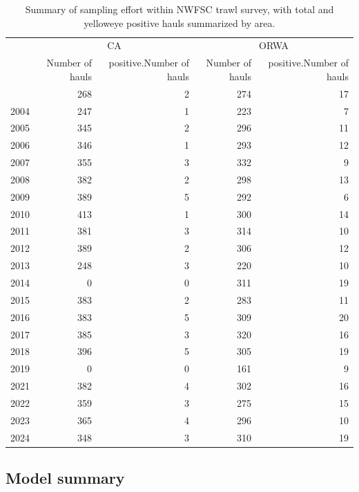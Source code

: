 \documentclass[
]{scrartcl}
\begin{document}
\begin{longtable}{l|rrrr}

\caption{\label{tbl-sampling-effort-nwfsc}Summary of sampling effort
within NWFSC trawl survey, with total and yelloweye positive hauls
summarized by area.}

\tabularnewline

\toprule
 & \multicolumn{2}{c}{CA} & \multicolumn{2}{c}{ORWA} \\ 
\cmidrule(lr){2-3} \cmidrule(lr){4-5}
 & Number of hauls & positive.Number of hauls & Number of hauls & positive.Number of hauls \\ 
\midrule\addlinespace[2.5pt]
2003 & 268 & 2 & 274 & 17 \\ 
2004 & 247 & 1 & 223 & 7 \\ 
2005 & 345 & 2 & 296 & 11 \\ 
2006 & 346 & 1 & 293 & 12 \\ 
2007 & 355 & 3 & 332 & 9 \\ 
2008 & 382 & 2 & 298 & 13 \\ 
2009 & 389 & 5 & 292 & 6 \\ 
2010 & 413 & 1 & 300 & 14 \\ 
2011 & 381 & 3 & 314 & 10 \\ 
2012 & 389 & 2 & 306 & 12 \\ 
2013 & 248 & 3 & 220 & 10 \\ 
2014 & 0 & 0 & 311 & 19 \\ 
2015 & 383 & 2 & 283 & 11 \\ 
2016 & 383 & 5 & 309 & 20 \\ 
2017 & 385 & 3 & 320 & 16 \\ 
2018 & 396 & 5 & 305 & 19 \\ 
2019 & 0 & 0 & 161 & 9 \\ 
2021 & 382 & 4 & 302 & 16 \\ 
2022 & 359 & 3 & 275 & 15 \\ 
2023 & 365 & 4 & 296 & 10 \\ 
2024 & 348 & 3 & 310 & 19 \\ 
\bottomrule

\end{longtable}

\endgroup

\subsection{Model summary}\label{model-summary}

\begingroup
\fontsize{9.0pt}{10.8pt}\selectfont
\end{document}
